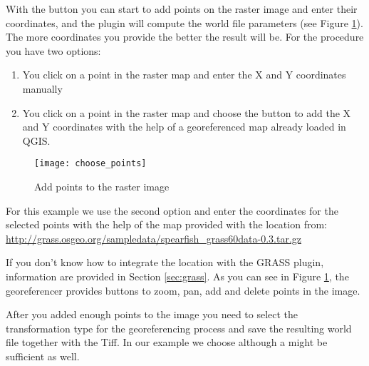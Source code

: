 With the button  you can start to add points on the raster image and enter their coordinates, and the plugin will compute the world file parameters (see Figure \ref{fig:choose_points}).
The more coordinates you provide the better the result will be.
For the procedure you have two options:

\begin{enumerate}
\item You click on a point in the raster map and enter the X and Y coordinates manually
\item You click on a point in the raster map and choose the button  to add the X and Y coordinates with the help of a georeferenced map already loaded in QGIS.
\end{enumerate}

\begin{figure}[ht]
\begin{center}
  \caption{Add points to the raster image \nixcaption}\label{fig:choose_points}\smallskip
  \texttt{[image: choose\_points]}
\end{center}
\end{figure}

For this example we use the second option and enter the coordinates for the selected points with the help of the  map provided with the   location from: \url{http://grass.osgeo.org/sampledata/spearfish\_grass60data-0.3.tar.gz}

If you don't know how to integrate the  location with
the GRASS plugin, information are provided in Section \ref{sec:grass}. As you
can see in Figure \ref{fig:choose_points}, the georeferencer provides buttons to zoom, pan, add and delete points in the image.

After you added enough points to the image you need to select the transformation type for the georeferencing process and save the resulting world file together with the Tiff.
In our example we choose 
although a 
might be sufficient as well.


\begin{Tip}\caption{\textsc{Choosing the transformation type}}
\end{Tip} 


